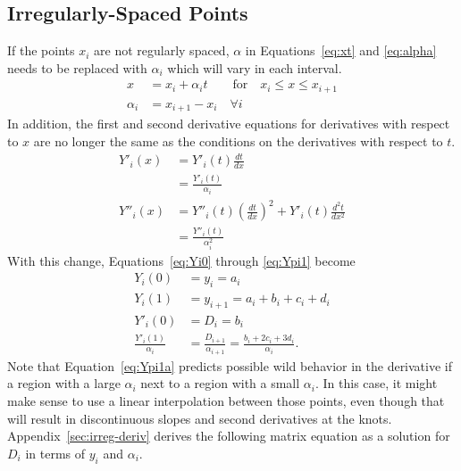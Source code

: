 \documentclass{scrartcl}
\begin{document}
\subsection{Irregularly-Spaced Points}
If the points $x_i$ are not regularly spaced, $\alpha$ in
Equations~\ref{eq:xt} and \ref{eq:alpha} needs to be replaced
with $\alpha_i$ which will vary in each interval.
\begin{align}
x &= x_i + \alpha_i t \qquad\mbox{for}\quad x_i\leq x\leq x_{i+1}\\
\alpha_i &= x_{i+1}-x_i \quad\forall i
\end{align}
In addition,
the first and second derivative equations for derivatives with
respect to $x$ are no longer the same as the conditions on the
derivatives with respect to $t$.
\begin{align}
Y'_i(x) &= Y'_i(t)\frac{dt}{dx}\\
&= \frac{Y'_i(t)}{\alpha_i}\\
Y''_i(x) &= Y''_i(t)\left(\frac{dt}{dx}\right)^2 +
	Y'_i(t)\frac{d^2t}{dx^2}\\
	&= \frac{Y''_i(t)}{\alpha_i^2}
\end{align}
With this change, Equations~\ref{eq:Yi0} through \ref{eq:Ypi1}
become
\begin{align}
Y_i(0)&=y_i = a_i \label{eq:Yi0a}\\
Y_i(1)&=y_{i+1} = a_i + b_i + c_i + d_i\\
Y'_i(0) &= D_i = b_i\\
\frac{Y'_i(1)}{\alpha_i} &= \frac{D_{i+1}}{\alpha_{i+1}}
 = \frac{b_i + 2 c_i + 3 d_i}{\alpha_i}. \label{eq:Ypi1a}
\end{align}
Note that Equation~\ref{eq:Ypi1a} predicts possible
wild behavior in the derivative if
a region with a large $\alpha_i$ next to a region
with a small $\alpha_i$. In this case, it might make sense to
use a linear interpolation between those points, even though
that will result in discontinuous slopes and second derivatives
at the knots. Appendix~\ref{sec:irreg-deriv} derives the following
matrix equation as a solution for $D_i$ in terms of
$y_i$ and $\alpha_i$.
\end{document}
